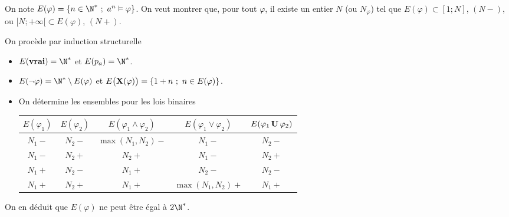 \begin{Answer}
On note $E(\varphi) = \{n\in \N^*\ ;\ a^n \vDash \varphi\}$. 
On veut montrer que, pour tout $\varphi$, il existe un entier $N$ (ou $N_\varphi$) tel que $E(\varphi)\subset [1;N]$, $(N-)$, ou $[ N;+\infty[ \subset E(\varphi)$, $(N+)$.

On procède par induction structurelle

\begin{itemize}
\item $E({\bf vrai})=\N^*$ et $E(p_a)=\N^*$.
\item $E(\neg \varphi) =\N^*\setminus E(\varphi)$ et $E\bigl({\bf X}(\varphi)\bigr) =\{1+n\ ;\ n\in E(\varphi)\}$.
\item On détermine les ensembles pour les lois binaires

\begin{center}
\begin{tabular}{cc|c|c|c}
$E(\varphi_1)$ & $E(\varphi_2)$ & $E(\varphi_1\wedge \varphi_2) $& $E(\varphi_1\vee \varphi_2) $& $E(\varphi_1\,{\bf U}\,\varphi_2) $ \\
\hline
$N_1-$ & $N_2-$ & $\max(N_1,N_2)-$ & $N_1-$           & $N_2-$\\
$N_1-$ & $N_2+$ & $N_2+$           & $N_1-$           & $N_2+$\\
$N_1+$ & $N_2-$ & $N_1+$           & $N_2-$           & $N_2-$ \\
$N_1+$ & $N_2+$ & $N_1+$           & $\max(N_1,N_2)+$ & $N_1+$ \\
\end{tabular}
\end{center}
\end{itemize}

On en déduit que $E(\varphi)$ ne peut être égal à $2\N^*$.
\end{Answer}
